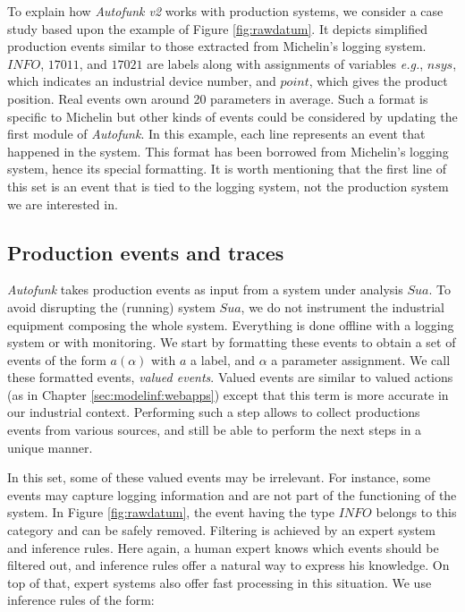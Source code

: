 To explain how \textit{Autofunk v2} works with production
systems, we consider a case study based upon the example of
Figure \ref{fig:rawdatum}. It depicts simplified production
events similar to those extracted from Michelin's logging system.
$INFO$, $17011$, and $17021$ are labels along with assignments of
variables \emph{e.g.}, $nsys$, which indicates an industrial
device number, and $point$, which gives the product position.
Real events own around 20 parameters in average. Such a format is
specific to Michelin but other kinds of events could be
considered by updating the first module of \textit{Autofunk}.  In
this example, each line represents an event that happened in the
system. This format has been borrowed from Michelin's logging
system, hence its special formatting. It is worth mentioning that
the first line of this set is an event that is tied to the
logging system, not the production system we are interested in.

\subsection{Production events and traces}
\label{part3:collecting}

\textit{Autofunk} takes production events as input from a system
under analysis $\mathit{Sua}$. To avoid disrupting the (running)
system $\mathit{Sua}$, we do not instrument the industrial
equipment composing the whole system. Everything is done offline
with a logging system or with monitoring. We start by formatting
these events to obtain a set of events of the form $a(\alpha)$
with $a$ a label, and $\alpha$ a parameter assignment. We call
these formatted events, \textit{valued events}. Valued events are
similar to valued actions (as in Chapter
\ref{sec:modelinf:webapps}) except that this term is more
accurate in our industrial context.  Performing such a step
allows to collect productions events from various sources, and
still be able to perform the next steps in a unique manner.

In this set, some of these valued events may be irrelevant.  For
instance, some events may capture logging information and are not
part of the functioning of the system. In Figure
\ref{fig:rawdatum}, the event having the type $INFO$
belongs to this category and can be safely removed. Filtering is
achieved by an expert system and inference rules. Here again, a
human expert knows which events should be filtered out, and
inference rules offer a natural way to express his knowledge. On
top of that, expert systems also offer fast processing in this
situation. We use inference rules of the form:

